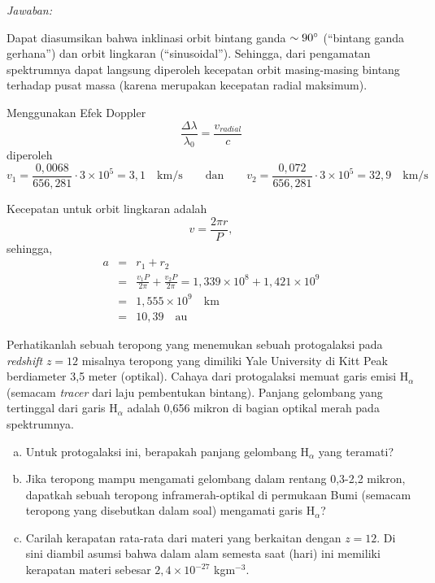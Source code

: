 \documentclass[11pt,fleqn, a4paper]{exam}
\begin{document}
\begin{questions}
\textit{Jawaban:}

Dapat diasumsikan bahwa inklinasi orbit bintang ganda $\sim 90\degree$ (``bintang ganda gerhana'') dan orbit lingkaran (``sinusoidal''). Sehingga, dari pengamatan spektrumnya dapat langsung diperoleh kecepatan orbit masing-masing bintang terhadap pusat massa (karena merupakan kecepatan radial maksimum).

Menggunakan Efek Doppler
\begin{equation*}
\frac{\Delta \lambda}{ \lambda_{0}} = \frac{v_{radial}}{c}
\end{equation*}
diperoleh
\begin{equation*}
v_{1} = \frac{0,0068}{656,281} \cdot 3 \times 10^{5} = 3,1 \quad \text{km/s} \qquad \text{dan} \qquad v_{2} = \frac{0,072}{656,281} \cdot 3 \times 10^{5} = 32,9 \quad \text{km/s}
\end{equation*}

Kecepatan untuk orbit lingkaran adalah
\begin{equation*}
v = \frac{2 \pi r}{P},
\end{equation*}
sehingga,
\begin{eqnarray*}
a &=& r_{1} + r_{2} \\
&=& \frac{v_1 P}{2 \pi} + \frac{v_2 P}{2 \pi} = 1,339 \times 10^{8} + 1,421 \times 10^{9}\\
&=& 1,555 \times 10^{9} \quad \text{km}\\
&=& 10,39 \quad \text{au}
\end{eqnarray*}


\vspace{0.5cm}
\question Perhatikanlah sebuah teropong yang menemukan sebuah protogalaksi pada \textit{redshift} $z=12$ misalnya teropong yang dimiliki Yale University di Kitt Peak berdiameter 3,5 meter (optikal). Cahaya dari protogalaksi memuat garis emisi H$_{\alpha}$ (semacam \textit{tracer} dari laju pembentukan bintang). Panjang gelombang yang tertinggal dari garis H$_{\alpha}$ adalah 0,656 mikron di bagian optikal merah pada spektrumnya.
\begin{enumerate}[(a)]
\item Untuk protogalaksi ini, berapakah panjang gelombang H$_{\alpha}$ yang teramati?
\item Jika teropong mampu mengamati gelombang dalam rentang 0,3-2,2 mikron, dapatkah sebuah teropong inframerah-optikal di permukaan Bumi (semacam teropong yang disebutkan dalam soal) mengamati garis H$_{\alpha}$?
\item Carilah kerapatan rata-rata dari materi yang berkaitan dengan $z=12$. Di sini diambil asumsi bahwa dalam alam semesta saat (hari) ini memiliki kerapatan materi sebesar $2,4\times 10^{-27}$ kgm$^{-3}$.
\end{enumerate}


\end{questions}
\end{document}
